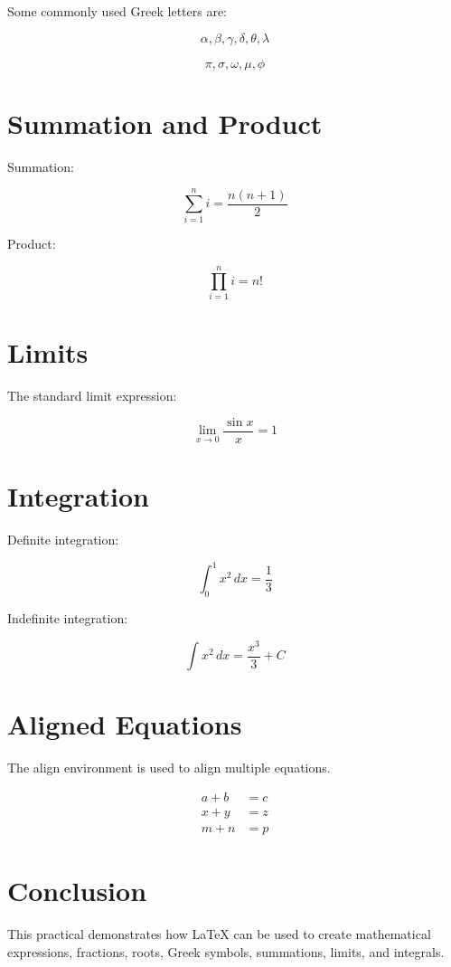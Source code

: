 \documentclass[12pt,a4paper]{article}
\begin{document}
Some commonly used Greek letters are:

\[
\alpha, \beta, \gamma, \delta, \theta, \lambda
\]

\[
\pi, \sigma, \omega, \mu, \phi
\]

\section{Summation and Product}

Summation:

\[
\sum_{i=1}^{n} i = \frac{n(n+1)}{2}
\]

Product:

\[
\prod_{i=1}^{n} i = n!
\]

\section{Limits}

The standard limit expression:

\[
\lim_{x \to 0} \frac{\sin x}{x} = 1
\]

\section{Integration}

Definite integration:

\[
\int_0^1 x^2\,dx = \frac{1}{3}
\]

Indefinite integration:

\[
\int x^2\,dx = \frac{x^3}{3}+C
\]

\section{Aligned Equations}

The align environment is used to align multiple equations.

\begin{align}
a+b &= c \\
x+y &= z \\
m+n &= p
\end{align}

\section{Conclusion}

This practical demonstrates how LaTeX can be used to
create mathematical expressions, fractions, roots,
Greek symbols, summations, limits, and integrals.
\end{document}
